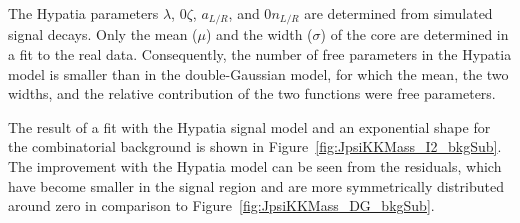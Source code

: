 The Hypatia parameters $\lambda$\textapprox{}, 0\textlt$\zeta$, $a_{L/R}$, and 0\textlt$n_{L/R}$ are
determined from simulated \BstoJpsiphi{} signal decays. Only the mean ($\mu$\unitsp\MeV) and the width
($\sigma$\unitsp\MeV) of the core are determined in a fit to the real data. Consequently, the number of free parameters in the
Hypatia model is smaller than in the double-Gaussian model, for which the mean, the two widths, and the relative contribution of the two
functions were free parameters.

The result of a fit with the Hypatia signal model and an exponential shape for the combinatorial background is shown in
Figure~\ref{fig:JpsiKKMass_I2_bkgSub}. The improvement with the Hypatia model can be seen from the residuals, which have become smaller in
the signal region and are more symmetrically distributed around zero in comparison to Figure~\ref{fig:JpsiKKMass_DG_bkgSub}.

